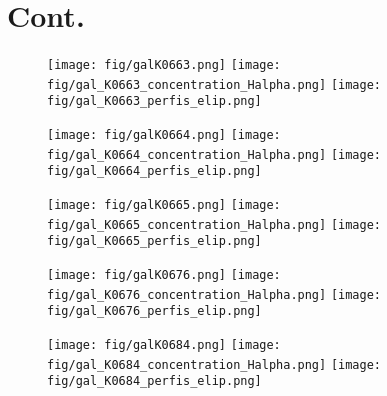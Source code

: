 \chapter{Cont.}
\label{cap02}



\begin{figure}[!ht]
\begin{center}
\setcaptionmargin{1cm}
\texttt{[image: fig/galK0663.png]}
\texttt{[image: fig/gal\_K0663\_concentration\_Halpha.png]}
\texttt{[image: fig/gal\_K0663\_perfis\_elip.png]}
\end{center}
\end{figure}


\begin{figure}[!ht]
\begin{center}
\setcaptionmargin{1cm}
\texttt{[image: fig/galK0664.png]}
\texttt{[image: fig/gal\_K0664\_concentration\_Halpha.png]}
\texttt{[image: fig/gal\_K0664\_perfis\_elip.png]}
\end{center}
\end{figure}


\begin{figure}[!ht]
\begin{center}
\setcaptionmargin{1cm}
\texttt{[image: fig/galK0665.png]}
\texttt{[image: fig/gal\_K0665\_concentration\_Halpha.png]}
\texttt{[image: fig/gal\_K0665\_perfis\_elip.png]}
\end{center}
\end{figure}


\begin{figure}[!ht]
\begin{center}
\setcaptionmargin{1cm}
\texttt{[image: fig/galK0676.png]}
\texttt{[image: fig/gal\_K0676\_concentration\_Halpha.png]}
\texttt{[image: fig/gal\_K0676\_perfis\_elip.png]}
\end{center}
\end{figure}


\begin{figure}[!ht]
\begin{center}
\setcaptionmargin{1cm}
\texttt{[image: fig/galK0684.png]}
\texttt{[image: fig/gal\_K0684\_concentration\_Halpha.png]}
\texttt{[image: fig/gal\_K0684\_perfis\_elip.png]}
\end{center}
\end{figure}


